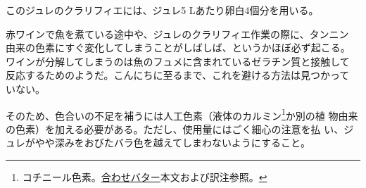 \begin{recette}
このジュレのクラリフィエには、ジュレ5 Lあたり卵白4個分を用いる。

赤ワインで魚を煮ている途中や、ジュレのクラリフィエ作業の際に、タンニン
由来の色素にすぐ変化してしまうことがしばしば、というかほぼ必ず起こる。
ワインが分解してしまうのは魚のフュメに含まれているゼラチン質と接触して
反応するためのようだ。こんにちに至るまで、これを避ける方法は見つかって
いない。

そのため、色合いの不足を補うには人工色素（液体のカルミン\footnote{コチニール色素。\protect\hyperlink{beurres-composes}{合わせバター}本文および訳注参照。}か別の植
物由来の色素）を加える必要がある。ただし、使用量にはごく細心の注意を払
い、ジュレがやや深みをおびたバラ色を越えてしまわないようにすること。
\end{recette}